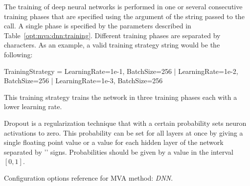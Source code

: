 The training of deep neural networks is performed in one or several
consecutive training phases that are specified using the
 argument of the  string passed
to the  call. A single phase is specified by the
parameters described in Table~\ref{opt:mva:dnn:training}. Different
training phases are separated by \code{|} characters.
 As an example, a valid training strategy string would be the following:

\begin{tmvacode}
  TrainingStrategy = LearningRate=1e-1, BatchSize=256
                   | LearningRate=1e-2, BatchSize=256
                   | LearningRate=1e-3, BatchSize=256
\end{tmvacode}

This training strategy trains the network in three training phases
each with a lower learning rate.

Dropout is a regularization technique that with a certain probability
sets neuron activations to zero. This probability can be set for all
layers at once by giving a single floating point value or a value for
each hidden layer of the network separated by '\code{+}'
signs. Probabilities should be given by a value in the interval
$[0,1]$.

\begin{option}[h]

\caption[.]{\optionCaptionSize
     Configuration options reference for MVA method: {\em DNN}.
}
\label{opt:mva:dnn:training}
\end{option}

\clearpage

